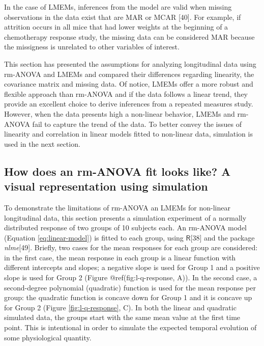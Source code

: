 \documentclass[
]{article}
\begin{document}
In the case of LMEMs, inferences from the model are valid when missing observations in the data exist that are MAR or MCAR {[}40{]}. For example, if attrition occurs in all mice that had lower weights at the beginning of a chemotherapy response study, the missing data can be considered MAR because the missigness is unrelated to other variables of interest.

This section has presented the assumptions for analyzing longitudinal data using rm-ANOVA and LMEMs and compared their differences regarding linearity, the covariance matrix and missing data. Of notice, LMEMs offer a more robust and flexible approach than rm-ANOVA and if the data follows a linear trend, they provide an excellent choice to derive inferences from a repeated measures study. However, when the data presents high a non-linear behavior, LMEMs and rm-ANOVA fail to capture the trend of the data. To better convey the issues of linearity and correlation in linear models fitted to non-linear data, simulation is used in the next section.

\hypertarget{simulation}{%
\subsection{How does an rm-ANOVA fit looks like? A visual representation using simulation}\label{simulation}}

To demonstrate the limitations of rm-ANOVA an LMEMs for non-linear longitudinal data, this section presents a simulation experiment of a normally distributed response of two groups of 10 subjects each. An rm-ANOVA model (Equation \eqref{eq:linear-model}) is fitted to each group, using \(\textsf{R}\){[}38{]} and the package \emph{nlme}{[}49{]}.
Briefly, two cases for the mean responses for each group are considered: in the first case, the mean response in each group is a linear function with different intercepts and slopes; a negative slope is used for Group 1 and a positive slope is used for Group 2 (Figure @ref(fig:l-q-response, A)). In the second case, a second-degree polynomial (quadratic) function is used for the mean response per group: the quadratic function is concave down for Group 1 and it is concave up for Group 2 (Figure \ref{fig:l-q-response}, C). In both the linear and quadratic simulated data, the groups start with the same mean value at the first time point. This is intentional in order to simulate the expected temporal evolution of some physiological quantity.
\end{document}
